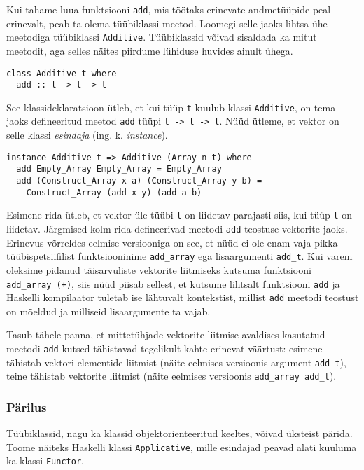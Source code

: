 \documentclass[12pt]{article}
\begin{document}
      Kui tahame luua funktsiooni \verb!add!, mis töötaks erinevate andmetüüpide peal erinevalt, peab ta olema tüübiklassi meetod. Loomegi selle jaoks lihtsa ühe meetodiga tüübiklassi \verb!Additive!. Tüübiklassid võivad sisaldada ka mitut meetodit, aga selles näites piirdume lühiduse huvides ainult ühega.

      \begin{verbatim}class Additive t where
  add :: t -> t -> t\end{verbatim}

      See klassideklaratsioon ütleb, et kui tüüp \verb!t! kuulub klassi \verb!Additive!, on tema jaoks defineeritud meetod \verb!add! tüüpi \verb!t -> t -> t!. Nüüd ütleme, et vektor on selle klassi \textit{esindaja} (ing. k. \textit{instance}).

      \begin{verbatim}instance Additive t => Additive (Array n t) where
  add Empty_Array Empty_Array = Empty_Array
  add (Construct_Array x a) (Construct_Array y b) =
    Construct_Array (add x y) (add a b)\end{verbatim}

      Esimene rida ütleb, et vektor üle tüübi \verb!t! on liidetav parajasti siis, kui tüüp \verb!t! on liidetav. Järgmised kolm rida defineerivad meetodi \verb!add! teostuse vektorite jaoks. Erinevus võrreldes eelmise versiooniga on see, et nüüd ei ole enam vaja pikka tüübispetsiifilist funktsiooninime \verb!add_array! ega lisaargumenti \verb!add_t!. Kui varem oleksime pidanud täisarvuliste vektorite liitmiseks kutsuma funktsiooni \verb!add_array (+)!, siis nüüd piisab sellest, et kutsume lihtsalt funktsiooni \verb!add! ja Haskelli kompilaator tuletab ise lähtuvalt kontekstist, millist \verb!add! meetodi teostust on mõeldud ja milliseid lisaargumente ta vajab.

      Tasub tähele panna, et mittetühjade vektorite liitmise avaldises kasutatud meetodi \verb!add! kutsed tähistavad tegelikult kahte erinevat väärtust: esimene tähistab vektori elementide liitmist (näite eelmises versioonis argument \verb!add_t!), teine tähistab vektorite liitmist (näite eelmises versioonis \verb!add_array add_t!).
      \subsubsection{Pärilus}
        Tüübiklassid, nagu ka klassid objektorienteeritud keeltes, võivad üksteist pärida. Toome näiteks Haskelli klassi \verb!Applicative!, mille esindajad peavad alati kuuluma ka klassi \verb!Functor!.
\end{document}
